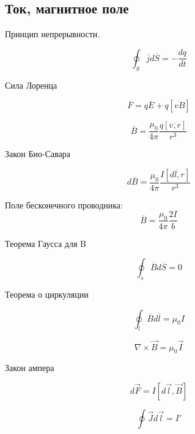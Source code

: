 \subsection{Ток, магнитное поле}
Принцип непрерывности.

\begin{equation}
\oint_S \overline{j} d \overline{S} = -\frac{dq}{dt}
\end{equation}

Сила Лоренца

\begin{equation}
\overline{F} = q \overline{E} + q [\overline{v B}]
\end{equation}

\begin{equation}
\overline{B}  = \frac{\mu_0}{4  \pi} \frac{q [\overline{v, r}]}{r^3}
\end{equation}


Закон Био-Савара

\begin{equation}
d\overline{B} =  \frac{\mu_0}{4  \pi}  \frac{I [\overline{dl, r}]}{r^3}
\end{equation}

Поле бесконечного проводника:
\begin{equation}
\overline{B} =  \frac{\mu_0}{4  \pi} \frac{2I}{b}
\end{equation}


Теорема Гаусса для B

\begin{equation}
\oint_s \overline{B} d \overline{S} = 0
\end{equation}

Теорема о циркуляции

\begin{equation}
\oint_l \overline{B} d \overline{l} = \mu_0 I
\end{equation}

\begin{equation}
\nabla \times \overrightarrow{B} =  \mu_0 \overrightarrow{I}
\end{equation}

Закон ампера

\begin{equation}
d \overrightarrow{F} = I [d \overrightarrow{l},\overrightarrow{B} ]
\end{equation}


\begin{equation}
\oint \overrightarrow{J} d \overrightarrow{l} = I'
\end{equation}

